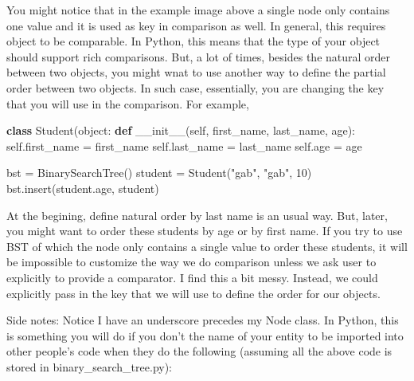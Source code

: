 \documentclass[11pt]{article}
\newenvironment{Shaded}{}{}
\newcommand{\KeywordTok}[1]{\textcolor[rgb]{0.00,0.44,0.13}{\textbf{{#1}}}}
\newcommand{\DecValTok}[1]{\textcolor[rgb]{0.25,0.63,0.44}{{#1}}}
\newcommand{\StringTok}[1]{\textcolor[rgb]{0.25,0.44,0.63}{{#1}}}
\newcommand{\FunctionTok}[1]{\textcolor[rgb]{0.02,0.16,0.49}{{#1}}}
\newcommand{\NormalTok}[1]{{#1}}
\newcommand{\VariableTok}[1]{\textcolor[rgb]{0.10,0.09,0.49}{{#1}}}
\newcommand{\OperatorTok}[1]{\textcolor[rgb]{0.40,0.40,0.40}{{#1}}}
\newcommand{\BuiltInTok}[1]{{#1}}
\begin{document}
You might notice that in the example image above a single node only
contains one value and it is used as key in comparison as well. In
general, this requires object to be comparable. In Python, this means
that the type of your object should support rich comparisons. But, a lot
of times, besides the natural order between two objects, you might wnat
to use another way to define the partial order between two objects. In
such case, essentially, you are changing the key that you will use in
the comparison. For example,

\begin{Shaded}
\begin{Highlighting}[]
\KeywordTok{class}\NormalTok{ Student(}\BuiltInTok{object}\NormalTok{:}
    \KeywordTok{def} \FunctionTok{__init__}\NormalTok{(}\VariableTok{self}\NormalTok{, first_name, last_name, age):}
        \VariableTok{self}\NormalTok{.first_name }\OperatorTok{=}\NormalTok{ first_name}
        \VariableTok{self}\NormalTok{.last_name }\OperatorTok{=}\NormalTok{ last_name}
        \VariableTok{self}\NormalTok{.age }\OperatorTok{=}\NormalTok{ age}
\end{Highlighting}
\end{Shaded}

\begin{Shaded}
\begin{Highlighting}[]
\NormalTok{bst }\OperatorTok{=}\NormalTok{ BinarySearchTree()}
\NormalTok{student }\OperatorTok{=}\NormalTok{ Student(}\StringTok{"gab"}\NormalTok{, }\StringTok{"gab"}\NormalTok{, }\DecValTok{10}\NormalTok{)}
\NormalTok{bst.insert(student.age, student)}
\end{Highlighting}
\end{Shaded}

At the begining, define natural order by last name is an usual way. But,
later, you might want to order these students by age or by first name.
If you try to use BST of which the node only contains a single value to
order these students, it will be impossible to customize the way we do
comparison unless we ask user to explicitly to provide a comparator. I
find this a bit messy. Instead, we could explicitly pass in the key that
we will use to define the order for our objects.

Side notes: Notice I have an underscore precedes my Node class. In
Python, this is something you will do if you don't the name of your
entity to be imported into other people's code when they do the
following (assuming all the above code is stored in
binary\_search\_tree.py):
\end{document}
